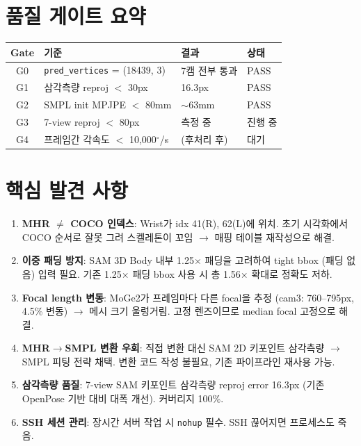 \documentclass[11pt, a4paper]{article}
\begin{document}
\section{품질 게이트 요약}

\begin{center}
\begin{tabular}{c l l l}
\toprule
\textbf{Gate} & \textbf{기준} & \textbf{결과} & \textbf{상태} \\
\midrule
G0 & \texttt{pred\_vertices} = (18439, 3) & 7캠 전부 통과 & \textcolor{pass}{PASS} \\
G1 & 삼각측량 reproj $<$ 30px & 16.3px & \textcolor{pass}{PASS} \\
G2 & SMPL init MPJPE $<$ 80mm & $\sim$63mm & \textcolor{pass}{PASS} \\
G3 & 7-view reproj $<$ 80px & 측정 중 & \textcolor{warn}{진행 중} \\
G4 & 프레임간 각속도 $<$ 10,000$^\circ$/s & (후처리 후) & 대기 \\
\bottomrule
\end{tabular}
\end{center}

\section{핵심 발견 사항}

\begin{enumerate}
    \item \textbf{MHR $\neq$ COCO 인덱스}: Wrist가 idx 41(R), 62(L)에 위치. 초기 시각화에서 COCO 순서로 잘못 그려 스켈레톤이 꼬임 $\to$ 매핑 테이블 재작성으로 해결.

    \item \textbf{이중 패딩 방지}: SAM 3D Body 내부 1.25$\times$ 패딩을 고려하여 tight bbox (패딩 없음) 입력 필요. 기존 1.25$\times$ 패딩 bbox 사용 시 총 1.56$\times$ 확대로 정확도 저하.

    \item \textbf{Focal length 변동}: MoGe2가 프레임마다 다른 focal을 추정 (cam3: 760--795px, 4.5\% 변동) $\to$ 메시 크기 울렁거림. 고정 렌즈이므로 median focal 고정으로 해결.

    \item \textbf{MHR$\to$SMPL 변환 우회}: 직접 변환 대신 SAM 2D 키포인트 삼각측량 $\to$ SMPL 피팅 전략 채택. 변환 코드 작성 불필요, 기존 파이프라인 재사용 가능.

    \item \textbf{삼각측량 품질}: 7-view SAM 키포인트 삼각측량 reproj error 16.3px (기존 OpenPose 기반 대비 대폭 개선). 커버리지 100\%.

    \item \textbf{SSH 세션 관리}: 장시간 서버 작업 시 \texttt{nohup} 필수. SSH 끊어지면 프로세스도 죽음.
\end{enumerate}
\end{document}
